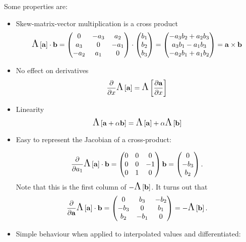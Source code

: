 Some properties are:
\begin{itemize}
\item Skew-matrix-vector multiplication is a cross product
  \begin{equation}
    \text{\Large{$\Lambda$}}\left[ {\mathbf{a}} \right] \cdot {\mathbf{b}}
    = \begin{pmatrix}
      0 & -a_3 & a_2 \\
      a_3 & 0 & -a_1 \\
      -a_2 & a_1 & 0
    \end{pmatrix}
    \cdot \begin{pmatrix} b_1 \\ b_2 \\ b_3 \end{pmatrix}
    = \begin{pmatrix} -a_3b_2 + a_2b_3 \\ a_3b_1 - a_1b_3 \\ -a_2b_1 + a_1b_2 \end{pmatrix}
    = {\mathbf{a}} \times {\mathbf{b}}
  \end{equation}

\item No effect on derivatives
  \begin{equation}
    \frac{\partial }{\partial x} \text{\Large{$\Lambda$}}\left[ {\mathbf{a}} \right] = \text{\Large{$\Lambda$}}\left[  \frac{\partial {\mathbf{a}}}{\partial x}  \right]
  \end{equation}

\item Linearity
  \begin{equation}
    \text{\Large{$\Lambda$}}\left[ {\mathbf{a}} + \alpha {\mathbf{b}} \right] = \text{\Large{$\Lambda$}}\left[ {\mathbf{a}} \right] + \alpha \text{\Large{$\Lambda$}}\left[ {\mathbf{b}} \right]
  \end{equation}

\item Easy to represent the Jacobian of a cross-product:

  \begin{equation}
    \frac{\partial }{\partial a_1} \text{\Large{$\Lambda$}}\left[ {\mathbf{a}} \right] \cdot {\mathbf{b}} = \begin{pmatrix}
      0 & 0 & 0 \\
      0 & 0 & -1 \\
      0 & 1 & 0
    \end{pmatrix}{\mathbf{b}} = \begin{pmatrix} 0 \\ -b_3 \\ b_2 \end{pmatrix}.
  \end{equation}
  Note that this is the first column of $-\text{\Large{$\Lambda$}}\left[ {\mathbf{b}} \right]$.
  It turns out that
  \begin{equation}
    \frac{\partial }{\partial {\mathbf{a}}} \text{\Large{$\Lambda$}}\left[ {\mathbf{a}} \right] \cdot {\mathbf{b}} = \begin{pmatrix}
      0 & b_3 & -b_2 \\
      -b_3 & 0 & b_1 \\
      b_2 & -b_1 & 0
    \end{pmatrix} = -\text{\Large{$\Lambda$}}\left[ {\mathbf{b}} \right].
    \label{eq:61}
  \end{equation}

\item Simple behaviour when applied to interpolated values and differentiated:


\end{itemize}
